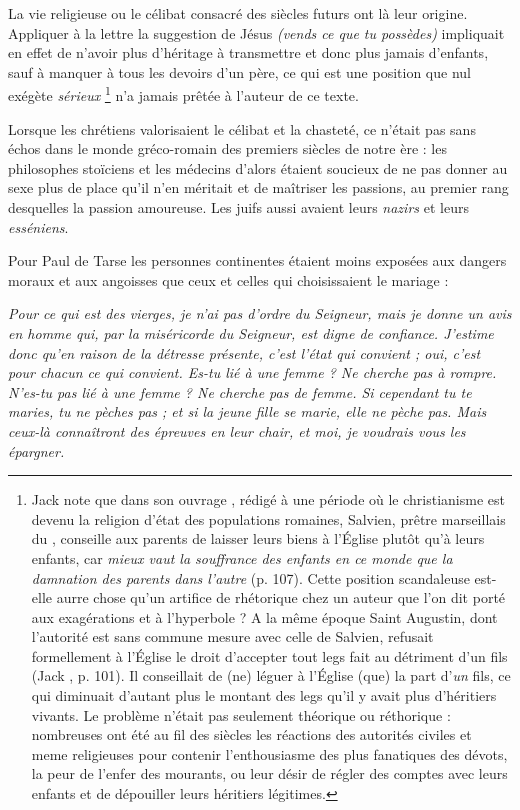  La vie religieuse ou le célibat consacré des siècles futurs ont là leur origine. Appliquer à la lettre la suggestion de Jésus \emph{(vends ce que tu possèdes)} impliquait en effet de n'avoir plus d'héritage à transmettre et donc plus jamais d'enfants, sauf à manquer à tous les devoirs d'un père, ce qui est une position que nul exégète \emph{sérieux}%
\footnote{Jack  note que dans son ouvrage , rédigé à une période où le christianisme est devenu la religion d'état des populations romaines, Salvien, prêtre marseillais du , conseille aux parents de laisser leurs biens à l'Église plutôt qu'à leurs enfants, car \emph{mieux vaut la souffrance des enfants en ce monde que la damnation des parents dans l'autre} (p. 107). Cette position scandaleuse est-elle aurre chose qu'un artifice de rhétorique chez un auteur que l'on dit porté aux exagérations et à l'hyperbole ? A la même époque Saint Augustin, dont l'autorité est sans commune mesure avec celle de Salvien, refusait formellement à l'Église le droit d'accepter tout legs fait au détriment d'un fils (Jack , p. 101). Il conseillait de (ne) léguer à l'Église (que) la part d'\emph{un} fils, ce qui diminuait d'autant plus le montant des legs qu'il y avait plus d'héritiers vivants. Le problème n'était pas seulement théorique ou réthorique : nombreuses ont été au fil des siècles les réactions des autorités civiles et meme religieuses pour contenir l'enthousiasme des plus fanatiques des dévots, la peur de l'enfer des mourants, ou leur désir de régler des comptes avec leurs enfants et de dépouiller leurs héritiers légitimes.}
n'a jamais prêtée à l'auteur de ce texte. 

 Lorsque les chrétiens valorisaient le célibat et la chasteté, ce n'était pas sans échos dans le monde gréco-romain des premiers siècles de notre ère : les philosophes stoïciens et les médecins d'alors étaient soucieux de ne pas donner au sexe plus de place qu'il n'en méritait et de maîtriser les passions, au premier rang desquelles la passion amoureuse. Les juifs aussi avaient leurs \emph{nazirs} et leurs \emph{esséniens}. 

 Pour Paul de Tarse les personnes continentes étaient moins exposées aux dangers moraux et aux angoisses que ceux et celles qui choisissaient le mariage :

\begin{displayquote}[I~Cor~7,~25-28]
\emph{Pour ce qui est des vierges, je n'ai pas d'ordre du Seigneur, mais je donne un avis en homme qui, par la miséricorde du Seigneur, est digne de confiance. J'estime donc qu'en raison de la détresse présente, c'est l'état qui convient ; oui, c'est pour chacun ce qui convient. Es-tu lié à une femme ? Ne cherche pas à rompre. N'es-tu pas lié à une femme ? Ne cherche pas de femme. Si cependant tu te maries, tu ne pèches pas ; et si la jeune fille se marie, elle ne pèche pas. Mais ceux-là connaîtront des épreuves en leur chair, et moi, je voudrais vous les épargner.}
\end{displayquote}


